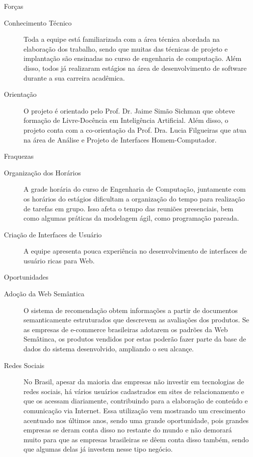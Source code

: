 \documentclass[]{article}
\begin{document}
\begin{description}
  \item Forças
  \begin{description}
    \item[Conhecimento Técnico] Toda a equipe está familiarizada com a área técnica abordada na elaboração dos trabalho, sendo que muitas das técnicas de projeto e implantação são ensinadas no curso de engenharia de computação. Além disso, todos já realizaram estágios na área de desenvolvimento de software durante a sua carreira acadêmica.
    
    \item[Orientação] 
    
     O projeto é orientado pelo Prof. Dr. Jaime Simão Sichman que obteve formação de Livre-Docência em Inteligência Artificial. Além disso, o projeto conta com a co-orientação da Prof. Dra. Lucia Filgueiras que atua na área de Análise e Projeto de Interfaces Homem-Computador.
     
  \end{description}
  
  \item Fraquezas
  \begin{description}
    \item[Organização dos Horários] A grade horária do curso de Engenharia de Computação, juntamente com os horários do estágios dificultam a organização do tempo para realização de tarefas em grupo. Isso afeta o tempo das reuniões presenciais, bem como algumas práticas da modelagem ágil, como programação pareada.
    \item[Criação de Interfaces de Usuário] A equipe apresenta pouca experiência no desenvolvimento de interfaces de usuário ricas para Web.
  \end{description}
  
  \item Oportunidades
  \begin{description}
    \item[Adoção da Web Semântica] O sistema de recomendação obtem informações a partir de documentos semanticamente estruturados que descrevem as avaliações dos produtos. Se as empresas de e-commerce brasileiras adotarem os padrões da Web Semâtinca, os produtos vendidos por estas poderão fazer parte da base de dados do sistema desenvolvido, ampliando o seu alcançe.
    \item[Redes Sociais]
         No Brasil, apesar da maioria das empresas não investir em tecnologias de redes sociais, há vários usuários cadastrados em sites de relacionamento e que os acessam diariamente, contribuindo para a elaboração de conteúdo e comunicação via Internet. Essa utilização vem mostrando um crescimento acentuado nos últimos anos, sendo uma grande oportunidade, pois grandes empresas se deram conta disso no restante do mundo e não demorará muito para que as empresas brasileiras se dêem conta disso também, sendo que algumas delas já investem nesse tipo negócio.
  \end{description}
  

\end{description}
\end{document}
